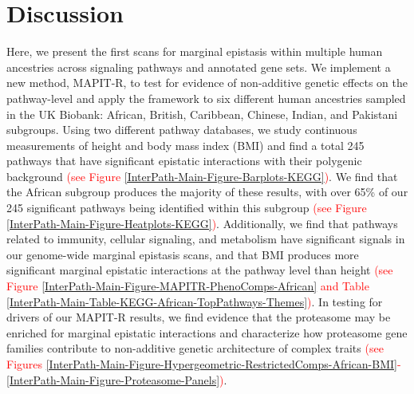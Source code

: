 \documentclass[10pt]{article}
\begin{document}


\section*{Discussion}\label{InterPath-Discussion}

Here, we present the first scans for marginal epistasis within multiple human ancestries across signaling pathways and annotated gene sets. We implement a new method, MAPIT-R, to test for evidence of non-additive genetic effects on the pathway-level and apply the framework to six different human ancestries sampled in the UK Biobank: African, British, Caribbean, Chinese, Indian, and Pakistani subgroups. Using two different pathway databases, we study continuous measurements of height and body mass index (BMI) and find a total 245 pathways that have significant epistatic interactions with their polygenic background \textcolor{red}{(see Figure \ref{InterPath-Main-Figure-Barplots-KEGG})}. We find that the African subgroup produces the majority of these results, with over 65\% of our 245 significant pathways being identified within this subgroup \textcolor{red}{(see Figure \ref{InterPath-Main-Figure-Heatplots-KEGG})}. Additionally, we find that pathways related to immunity, cellular signaling, and metabolism have significant signals in our genome-wide marginal epistasis scans, and that BMI produces more significant marginal epistatic interactions at the pathway level than height \textcolor{red}{(see Figure \ref{InterPath-Main-Figure-MAPITR-PhenoComps-African} and Table \ref{InterPath-Main-Table-KEGG-African-TopPathways-Themes})}. In testing for drivers of our MAPIT-R results, we find evidence that the proteasome may be enriched for marginal epistatic interactions and characterize how proteasome gene families contribute to non-additive genetic architecture of complex traits \textcolor{red}{(see Figures \ref{InterPath-Main-Figure-Hypergeometric-RestrictedComps-African-BMI}-\ref{InterPath-Main-Figure-Proteasome-Panels})}. 
\end{document}
